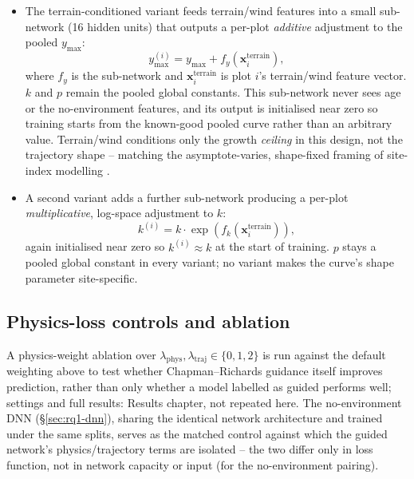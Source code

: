 \begin{itemize}
\setlength\itemsep{0pt}
\item The terrain-conditioned variant feeds terrain/wind features into a small sub-network
  (16 hidden units) that outputs a per-plot \emph{additive} adjustment to the pooled $y_{\max}$:
  \begin{equation}
  y_{\max}^{(i)} = y_{\max} + f_{y}\!\left(\mathbf{x}^{\text{terrain}}_i\right),
  \label{eq:ymax-adjust}
  \end{equation}
  where $f_y$ is the sub-network and $\mathbf{x}^{\text{terrain}}_i$ is plot $i$'s terrain/wind
  feature vector. $k$ and $p$ remain the pooled global constants. This sub-network never sees age
  or the no-environment features, and its output is initialised near zero so training starts from
  the known-good pooled curve rather than an arbitrary value. Terrain/wind conditions only the
  growth \emph{ceiling} in this design, not the trajectory shape -- matching the
  asymptote-varies, shape-fixed framing of site-index modelling
  \citep{socha2021}. %
\item A second variant adds a further sub-network producing a per-plot \emph{multiplicative},
  log-space adjustment to $k$:
  \begin{equation}
  k^{(i)} = k \cdot \exp\!\left(f_{k}\!\left(\mathbf{x}^{\text{terrain}}_i\right)\right),
  \label{eq:k-adjust}
  \end{equation}
  again initialised near zero so $k^{(i)}\approx k$ at the start of training. $p$ stays a pooled
  global constant in every variant; no variant makes the curve's shape parameter site-specific.
\end{itemize}

\subsection{Physics-loss controls and ablation}
\label{sec:rq1-ablation}

A physics-weight ablation over $\lambda_{\text{phys}},\lambda_{\text{traj}}\in\{0,1,2\}$ is run
against the default weighting above to test whether Chapman--Richards guidance itself improves
prediction, rather than only whether a model labelled as guided performs well; settings and full
results: Results chapter, not repeated here. The no-environment DNN (\S\ref{sec:rq1-dnn}), sharing
the identical network architecture and trained under the same splits, serves as the matched
control against which the guided network's physics/trajectory terms are isolated -- the two
differ only in loss function, not in network capacity or input (for the no-environment pairing).

